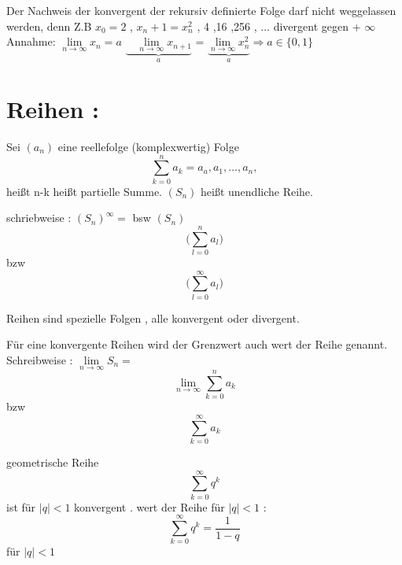 \begin{remark}
Der Nachweis der konvergent der rekursiv definierte Folge darf nicht weggelassen werden, denn Z.B $x_0=2$ , $x_n+1=x_n^2$ \quad \quad {} , 4 ,16 ,256 , $\dots $ divergent gegen + $\infty$  \\

Annahme: $\lim\limits_{n \rightarrow \infty}{x_n}= a $ 
$\underbrace{\quad \lim\limits_{n \rightarrow \infty}{x_{n+1}}}_{a}$ = 
$\underbrace{\lim\limits_{n \rightarrow \infty}{x_n^2}}_{a} \Rightarrow a \in \{ 0,1 \}$
\end{remark}  

 
\newpage
\section{Reihen :}
\begin{definition}
Sei $(a_n)$ eine reellefolge (komplexwertig) Folge\\
$$\sum_{k = 0}^{n} {a_k} = a_a , a_1, \dots , a_n , $$
heißt n-k heißt partielle Summe.
$(S_n)$ heißt unendliche Reihe.

schriebweise : $(S_n)^\infty =$ bsw 
$(S_n)$ $$ \bigg( \sum_{l=0}^{n} {a_l} \bigg)$$ bzw
 $$ \bigg( \sum_{l=0}^{\infty} {a_l} \bigg)$$  
\end{definition}

\begin{remark}
Reihen sind spezielle Folgen , alle konvergent oder divergent. 
\end{remark}

\begin{definition}
Für eine konvergente Reihen wird der Grenzwert auch wert der Reihe genannt.\\
Schreibweise :  $\lim\limits_{n \rightarrow \infty}{S_n}= $
$$\lim\limits_{n \rightarrow \infty}{ \sum_{k=0}^{n} {a_k} }  $$ 
bzw 
$$ \sum_{k=0}^{\infty} {a_k}  $$
\end{definition}
 
\begin{example}
geometrische Reihe $$ \sum_{k=0}^{\infty} {q^k} $$
ist für $|q|<1$ konvergent . wert der Reihe für $|q|<1$ : 
$$ \sum_{k=0}^{\infty} {q^k}= \frac{1}{1-q}$$ für $|q| < 1 $ 
\end{example}





